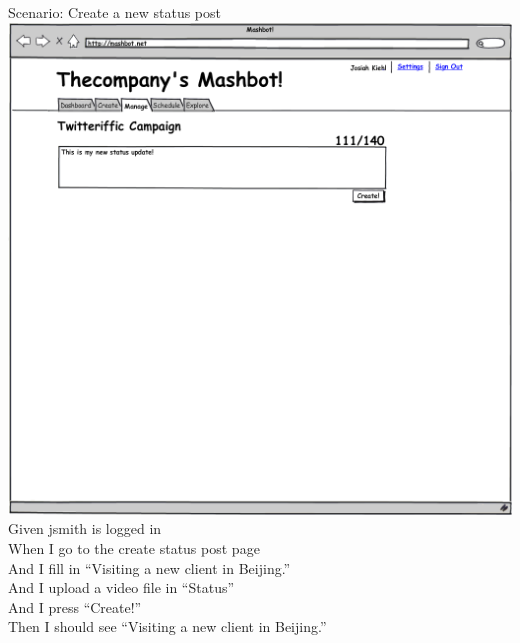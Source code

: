 \documentclass[12pt]{article}
\begin{document}
\begin{hangparas}{0.25in}{1}
  Scenario: Create a new status post \\
\includegraphics[width=\textwidth]{../mockups/manage-create-status-update.png}
    Given jsmith is logged in \\
    When I go to the create status post page \\
    And I fill in ``Visiting a new client in Beijing.'' \\
    And I upload a video file in ``Status'' \\
    And I press ``Create!'' \\
    Then I should see ``Visiting a new client in Beijing.'' \\


\end{hangparas}
\end{document}
